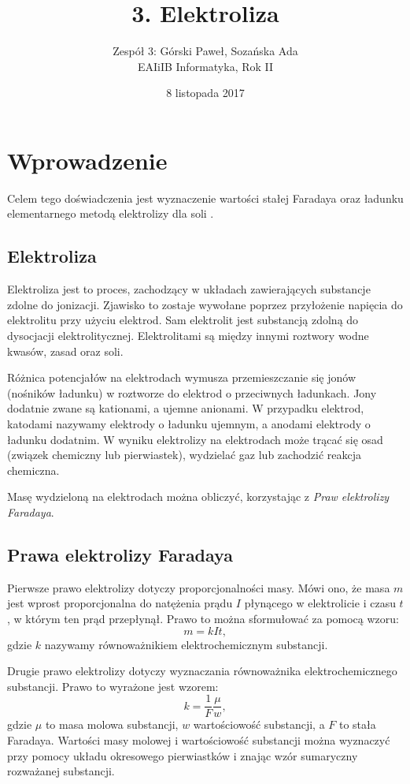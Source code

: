 \documentclass[12pt,a4paper]{article}
\title{3. Elektroliza}
\date{8 listopada 2017}
\author{
	Zespół 3: Górski Paweł, Sozańska Ada\\
	EAIiIB Informatyka, Rok II
}
\numberwithin{equation}{section}
\begin{document}
\maketitle
\section{Wprowadzenie}
Celem tego doświadczenia jest wyznaczenie wartości stałej Faradaya oraz ładunku elementarnego metodą elektrolizy dla soli .

\subsection{Elektroliza}

Elektroliza jest to proces, zachodzący w układach zawierających substancje zdolne do jonizacji. Zjawisko to zostaje wywołane poprzez przyłożenie napięcia do elektrolitu przy użyciu elektrod. Sam elektrolit jest substancją zdolną do dysocjacji elektrolitycznej. Elektrolitami są między innymi roztwory wodne kwasów, zasad oraz soli. 

Różnica potencjałów na elektrodach wymusza przemieszczanie się jonów (nośników ładunku) w roztworze do elektrod o przeciwnych ładunkach. Jony dodatnie zwane są kationami, a ujemne anionami. W przypadku elektrod, katodami nazywamy elektrody o ładunku ujemnym, a anodami elektrody o ładunku dodatnim. W wyniku elektrolizy na elektrodach może trącać się osad (związek chemiczny lub pierwiastek), wydzielać gaz lub zachodzić reakcja chemiczna.

Masę wydzieloną na elektrodach można obliczyć, korzystając z \textit{Praw elektrolizy Faradaya}.

\subsection{Prawa elektrolizy Faradaya}

Pierwsze prawo elektrolizy dotyczy proporcjonalności masy. Mówi ono, że masa $m$ jest wprost proporcjonalna do natężenia prądu $I$ płynącego w elektrolicie i czasu $t$, w którym ten prąd przepłynął. Prawo to można sformułować za pomocą wzoru:
\begin{equation}
	m = kIt,
	\label{eq:faraday1}
\end{equation}
gdzie $k$ nazywamy równoważnikiem elektrochemicznym substancji.

Drugie prawo elektrolizy dotyczy wyznaczania równoważnika elektrochemicznego substancji. Prawo to wyrażone jest wzorem:
\begin{equation}
	k = \frac{1}{F}\frac{\mu}{w},
	\label{eq:faraday2}
\end{equation}
gdzie $\mu$ to masa molowa substancji, $w$ wartościowość substancji, a $F$ to stała Faradaya. Wartości masy molowej i wartościowość substancji można wyznaczyć przy pomocy układu okresowego pierwiastków i znając wzór sumaryczny rozważanej substancji.
\end{document}
